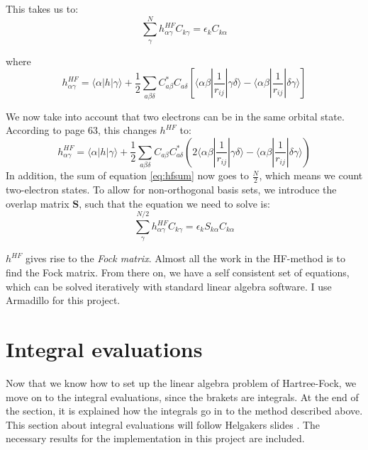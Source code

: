 \documentclass[a4paper,10pt, twocolumn, pre]{revtex4}
\newcommand{\mb}{\mathbf}
\newcommand{\sandwich}[3]{\langle {#1}|{#2}|{#3}\rangle}
\begin{document}
This takes us to:
\begin{equation}
	\sum_\gamma^N h_{\alpha\gamma}^{HF} C_{k\gamma} = \epsilon_k C_{k\alpha}
	\label{eq:hfsum}
\end{equation}

where 
\begin{equation}
	h_{\alpha\gamma}^{HF} = \langle \alpha |h|\gamma\rangle + \frac{1}{2}\sum_{a \beta \delta}  C^*_{a\beta}C_{a\delta} \left[ 
	\langle\alpha \beta|\frac{1}{r_{ij}}| \gamma \delta \rangle
	-
	\langle\alpha \beta|\frac{1}{r_{ij}}| \delta \gamma \rangle
	\right]
\end{equation}

We now take into account that two electrons can be in the same orbital state. According to \cite{thijssen2007computational} page 63, this changes $h^{HF}$ to:
\begin{equation}
	h_{\alpha\gamma}^{HF} = \sandwich{\alpha}{h}{\gamma} + \frac{1}{2}\sum_{a\beta\delta} C_{a\beta}C^*_{a\delta} (2\sandwich{\alpha\beta}{\frac{1}{r_{ij}}}{\gamma\delta}-\sandwich{\alpha\beta}{\frac{1}{r_{ij}}}{\delta\gamma} )
\end{equation}
In addition, the sum of equation \ref{eq:hfsum} now goes to $\frac{N}{2}$, which means we count two-electron states. To allow for non-orthogonal basis sets, we introduce the overlap matrix $\mb{S}$, such that the equation we need to solve is:
\begin{equation}
		\sum_\gamma^{N/2} h_{\alpha\gamma}^{HF} C_{k\gamma} = \epsilon_k S_{k\alpha}C_{k\alpha}
	\label{eq:hfsumfinal}
\end{equation}

$h^{HF}$ gives rise to the \emph{Fock matrix}. Almost all the work in the HF-method is to find the Fock matrix. From there on, we have a self consistent set of equations, which can be solved iteratively with standard linear algebra software. I use Armadillo \cite{Sanderson2011} for this project. 


\section{Integral evaluations}
Now that we know how to set up the linear algebra problem of Hartree-Fock, we move on to the integral evaluations, since the brakets are integrals. At the end of the section, it is explained how the integrals go in to the method described above. 
This section about integral evaluations will follow Helgakers slides \cite{helgaker2006}. The necessary results for the implementation in this project are included. 
\end{document}
